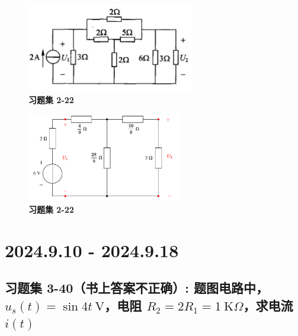 \documentclass[UTF8]{report}
\def\kO{\ \mathrm{K}\Omega}
\theoremstyle{MyLineTheoremStyle} %
\theoremstyle{MyBlockTheoremStyle} %
\theoremstyle{MySubsubsectionStyle} %
\begin{document}
\noindent\begin{minipage}{0.49\textwidth}
\begin{figure}[H]\centering
\includegraphics[height=110pt]{assets/2/0c8d1f0fb90ef6983c0aef6451919e4b.jpg}
\caption{\textbf{习题集 2-22}}
\end{figure}
\end{minipage}\hfill
\begin{minipage}{0.49\textwidth}
\begin{figure}[H]\centering
\includegraphics[height=110pt]{assets/2/2-22.drawio.pdf}
\caption{\textbf{习题集 2-22}}\label{2-22}
\end{figure}
\end{minipage}




\chapter{2024.9.10 - 2024.9.18}\thispagestyle{fancy}


\section{习题集 3-40（书上答案不正确）: 题图电路中，$u_s(t) = \sin 4t\ \mathrm{V} $，电阻 $R_2 = 2R_1 = 1 \kO$，求电流 $i(t)$}
\end{document}
